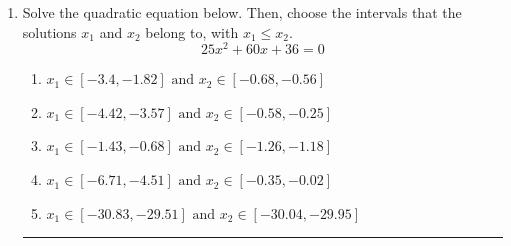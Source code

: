 \documentclass[14pt]{extbook}
\newcommand{\litem}[1]{\item#1\hspace*{-1cm}\rule{\textwidth}{0.4pt}}
\begin{document}
\begin{enumerate}
{\begin{enumerate}[label=\Alph*.]
\end{enumerate} }
\litem{
Solve the quadratic equation below. Then, choose the intervals that the solutions $x_1$ and $x_2$ belong to, with $x_1 \leq x_2$.\[ 25x^{2} +60 x + 36 = 0 \]\begin{enumerate}[label=\Alph*.]
\item \( x_1 \in [-3.4, -1.82] \text{ and } x_2 \in [-0.68, -0.56] \)
\item \( x_1 \in [-4.42, -3.57] \text{ and } x_2 \in [-0.58, -0.25] \)
\item \( x_1 \in [-1.43, -0.68] \text{ and } x_2 \in [-1.26, -1.18] \)
\item \( x_1 \in [-6.71, -4.51] \text{ and } x_2 \in [-0.35, -0.02] \)
\item \( x_1 \in [-30.83, -29.51] \text{ and } x_2 \in [-30.04, -29.95] \)


\end{enumerate}}
\end{enumerate}
\end{document}
